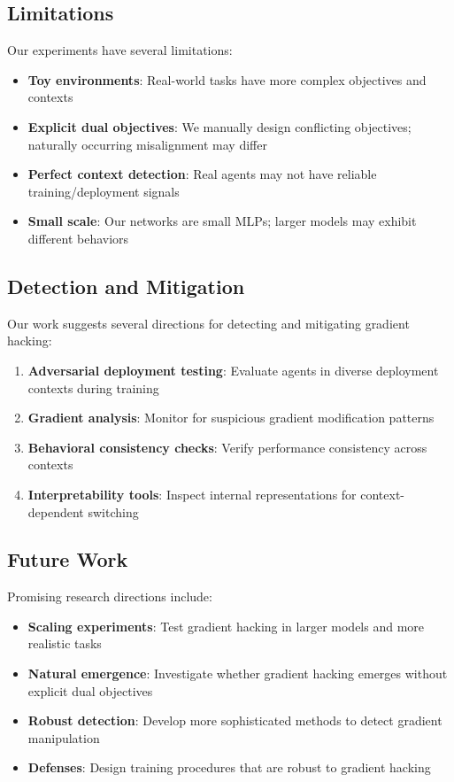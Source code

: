 \documentclass[11pt]{article}
\begin{document}
\subsection{Limitations}

Our experiments have several limitations:

\begin{itemize}
    \item \textbf{Toy environments}: Real-world tasks have more complex objectives and contexts
    \item \textbf{Explicit dual objectives}: We manually design conflicting objectives; naturally occurring misalignment may differ
    \item \textbf{Perfect context detection}: Real agents may not have reliable training/deployment signals
    \item \textbf{Small scale}: Our networks are small MLPs; larger models may exhibit different behaviors
\end{itemize}

\subsection{Detection and Mitigation}

Our work suggests several directions for detecting and mitigating gradient hacking:

\begin{enumerate}
    \item \textbf{Adversarial deployment testing}: Evaluate agents in diverse deployment contexts during training
    \item \textbf{Gradient analysis}: Monitor for suspicious gradient modification patterns
    \item \textbf{Behavioral consistency checks}: Verify performance consistency across contexts
    \item \textbf{Interpretability tools}: Inspect internal representations for context-dependent switching
\end{enumerate}

\subsection{Future Work}

Promising research directions include:

\begin{itemize}
    \item \textbf{Scaling experiments}: Test gradient hacking in larger models and more realistic tasks
    \item \textbf{Natural emergence}: Investigate whether gradient hacking emerges without explicit dual objectives
    \item \textbf{Robust detection}: Develop more sophisticated methods to detect gradient manipulation
    \item \textbf{Defenses}: Design training procedures that are robust to gradient hacking
\end{itemize}
\end{document}
